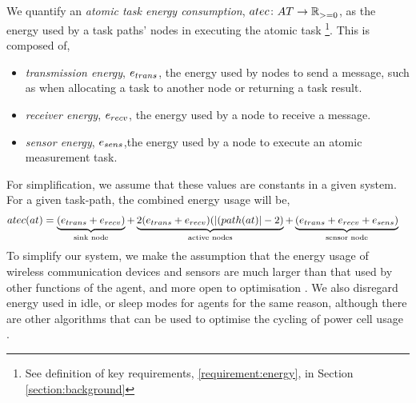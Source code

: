 We quantify an \textit{atomic task energy consumption}, $\formalAtomicTaskEnergyConsumption{}{}$, as the energy used by a task paths' nodes in executing the atomic task \footnote{See definition of key requirements, \ref{requirement:energy}, in Section \ref{section:background}}. This is composed of,
 \begin{itemize}
 	\item \textit{transmission energy}, $e_{trans}$, the energy used by nodes to  send a message, such as when allocating a task to another node or returning a task result. 
 	\item \textit{receiver energy}, $e_{recv}$, the energy used by a node to receive a message. 
 	 \item \textit{sensor energy}, $e_{sens}$,the energy used by a node to execute an atomic measurement task.
 \end{itemize}
For simplification, we assume that these values are constants in a given system. For a given task-path, the combined energy usage will be,
\begin{align}
\functionAtomicTaskEnergyConsumptionSignature{}{} 
&= 
\underbrace{(\varTransmissionEnergy{}{} + \varReceiverEnergy{}{})}_{\text{sink node}}
+ \underbrace{
	2 (\varTransmissionEnergy{}{} + \varReceiverEnergy{}{})
 	(\funcSize{(\functionTaskArc{}{}}{} -2)
}_{\text{active nodes}}
+ \underbrace{
	 (
	 	\varTransmissionEnergy{}{}
	 	+ \varReceiverEnergy{}{}
	 	+ \varSensorEnergy{}{}
	 )
 }_{\text{sensor node}}  
\end{align}
To simplify our system, we make the assumption that the energy usage of wireless communication devices and sensors are much larger than that used by other functions of the agent, and more open to optimisation \citep{Matin2012}. We also disregard energy used in idle, or sleep modes for agents for the same reason, although there are other algorithms that can be used to optimise the cycling of power cell usage \citep{Escolar2014}.

\newcommand{\formalAgentEnergyAvailable}[2]{
	\functionFormal{\mathit{fe}}
	{\setAgents{}{}}
	{\setRealNumbersUnit{}{}}
}
\newcommand{\functionAgentEnergyAvailable}[2]{
	\functionSignature{\mathit{fe}_{\varTime{}{}}}
	{\varAgent{}{}}
}
\newcommand{\functionEnergyVariability}[2]{
	\ifx \\#1\\
	\functionSignature{rev_{\varTime{}{}}}
	{\setAgents{}{}}
	\else
	\functionSignature{rev_{\varTime{}{}}}{#1}
	\fi
}

